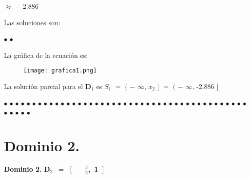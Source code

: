 \documentclass[12pt]{article}
\newenvironment{MyColorPar}[1]{%
    \leavevmode\color{#1}\ignorespaces%
}{%
}%
\begin{document}
\hspace{0.4cm} $\approx$ $-$ 2.886 \vspace{0.5cm}
 
Las soluciones son: \vspace{0.5cm}

\hspace{5cm} $\bullet$  \hspace{0.2cm} $\bullet$  

\newpage
 
La gráfica de la ecuación es: \vspace{0.5cm} 

\begin{figure}[htb] \centering

    \texttt{[image: grafica1.png]} 
    
\end{figure} \vspace{0.5cm}

La solución parcial para el {\bfseries{{\textcolor{Burnt Sienna}{\mbox{D$_{1}$}}}}} es $S_{1}$ $=$ $\big($ $-$ $\infty$, $x_{2}$ $\big]$ $=$ $\big($ $-$ $\infty$, -2.886 $\big]$

\vspace{4cm}

\begin{MyColorPar}{pakistangreen}
$\bullet$ $\bullet$ $\bullet$ $\bullet$ $\bullet$ $\bullet$ $\bullet$ $\bullet$ $\bullet$ $\bullet$ $\bullet$ $\bullet$ $\bullet$ $\bullet$ $\bullet$ $\bullet$ $\bullet$ $\bullet$ $\bullet$ $\bullet$ $\bullet$ $\bullet$ $\bullet$ $\bullet$ $\bullet$ $\bullet$ $\bullet$ $\bullet$ $\bullet$ $\bullet$ $\bullet$ $\bullet$ $\bullet$ $\bullet$ $\bullet$ $\bullet$ $\bullet$ $\bullet$ $\bullet$ $\bullet$ $\bullet$ $\bullet$ $\bullet$ $\bullet$ $\bullet$ $\bullet$ $\bullet$ $\bullet$ 
\end{MyColorPar} \vspace{.5cm}
\section*{{\textcolor{Tarawera}{\textsf{Dominio 2.}}}}

\begin{MyColorPar}{Tarawera}
{\bfseries{Dominio 2.}}  {\bfseries{{\textcolor{Burnt Sienna}{\mbox{D$_{2}$ $=$ {$\Big[$}  $-$ {\Large{$\frac{3}{2}$}}, 1 {$\Big ]\ $}}}}}}
\end{MyColorPar} \vspace{0.5cm}
\end{document}
